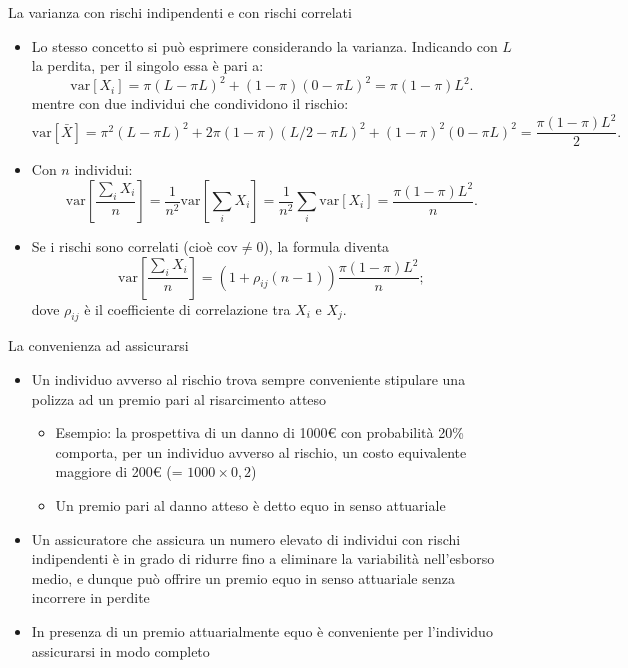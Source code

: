 \documentclass[aspectratio=64,11pt]{beamer}
\begin{document}
\begin{frame}{La varianza con rischi indipendenti e con rischi correlati}
\begin{itemize}
\item Lo stesso concetto si può esprimere considerando la varianza. Indicando con
\(L\) la perdita, per il singolo essa è pari a:
\begin{equation*}
  \text{var}[X_i]=\pi(L-\pi L)^2+(1-\pi)(0-\pi L)^2 =\pi(1-\pi)L^2.
\end{equation*}
mentre con due individui che condividono il rischio:
\begin{equation*}
\text{var}[\bar{X}] = \pi^2(L-\pi L)^2+2\pi(1-\pi)\left(L/2-\pi L\right)^2
+(1-\pi)^2(0-\pi L)^2=\frac{\pi(1-\pi)L^2}{2}.
\end{equation*}
\item Con \(n\) individui:
\begin{equation*}
  \text{var}\left[\frac{\sum_iX_i}{n}\right]
  =\frac{1}{n^2}\text{var}\left[\sum_iX_i\right]
  =\frac{1}{n^2}\sum_i\text{var}[X_i]=\frac{\pi(1-\pi)L^2}{n}.
\end{equation*}
\item Se i rischi sono correlati (cioè \(\text{cov}\not=0\)), la formula diventa
\begin{equation*}
\text{var}\left[\frac{\sum_iX_i}{n}\right]
=(1+\rho_{ij}(n-1))\frac{\pi(1-\pi)L^2}{n};
\end{equation*}
dove \(\rho_{ij}\) è il coefficiente di correlazione tra \(X_i\) e \(X_j\).
\end{itemize}
\end{frame}

\begin{frame}{La convenienza ad assicurarsi}
\begin{itemize}
\item Un individuo avverso al rischio trova sempre conveniente stipulare una polizza ad un
premio pari al risarcimento atteso
\begin{itemize}
\item Esempio: la prospettiva di un danno di 1000€ con probabilità 20\% comporta, per
un individuo avverso al rischio, un costo equivalente \alert{maggiore} di 200€
(= \(1000\times 0,2\))
\item Un premio pari al danno atteso è detto \alert{equo in senso attuariale}
\end{itemize}
\item Un assicuratore che assicura un numero elevato di individui con rischi
indipendenti è in grado di ridurre fino a eliminare la variabilità
nell'esborso medio, e dunque può offrire un premio equo in senso attuariale
senza incorrere in perdite
\item In presenza di un premio attuarialmente equo è conveniente per l'individuo
assicurarsi in modo completo
\end{itemize}
\end{frame}
\end{document}
